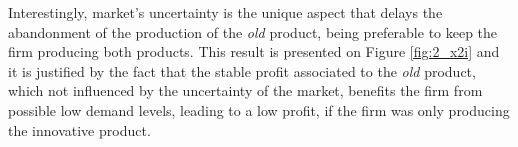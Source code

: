 

Interestingly, market's uncertainty is the unique aspect that delays the abandonment of the production of the \textit{old} product, being preferable to keep the firm producing both products. This result is presented on Figure \ref{fig:2_x2i} and it is justified by the fact that the stable profit associated to the \textit{old} product, which not influenced by the uncertainty of the market, benefits the firm from possible low demand levels, leading to a low profit, if the firm was only producing the innovative product.

